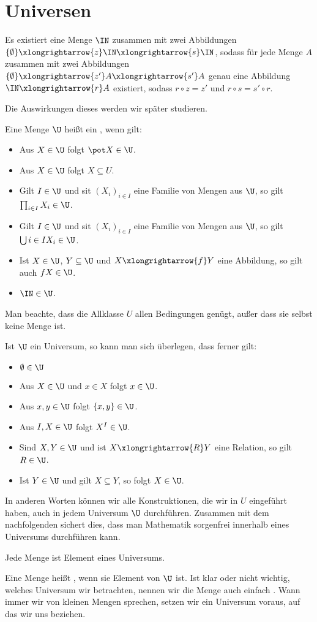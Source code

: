 \section{Universen}

\begin{axiom}
Es existiert eine Menge $\IN$ zusammen mit zwei Abbildungen $\{\emptyset\}\xlongrightarrow{z}\IN\xlongrightarrow{s}\IN$, sodass für jede Menge $A$ zusammen mit zwei Abbildungen $\{\emptyset\}\xlongrightarrow{z'}A\xlongrightarrow{s'}A$ genau eine Abbildung $\IN\xlongrightarrow{r}A$ existiert, sodass $r\circ z=z'$ und $r\circ s=s'\circ r$.
\end{axiom}
Die Auswirkungen dieses  werden wir später studieren.

Eine Menge $\U$ heißt ein , wenn gilt:
\begin{itemize}
\item Aus $X\in\U$ folgt $\pot X\in\U$.
\item Aus $X\in\U$ folgt $X\subseteq U$.
\item Gilt $I\in\U$ und sit $(X_i)_{i\in I}$ eine Familie von Mengen aus $\U$, so gilt $\prod_{i\in I}X_i\in\U$.
\item Gilt $I\in\U$ und sit $(X_i)_{i\in I}$ eine Familie von Mengen aus $\U$, so gilt $\bigcup{i\in I}X_i\in\U$.
\item Ist $X\in\U$, $Y\subseteq\U$ und $X\xlongrightarrow{f}Y$ eine Abbildung, so gilt auch $fX\in\U$.
\item $\IN\in\U$.
\end{itemize}

Man beachte, dass die Allklasse $U$ allen Bedingungen genügt, außer dass sie selbst keine Menge ist.

Ist $\U$ ein Universum, so kann man sich überlegen, dass ferner gilt:

\begin{itemize}
\item $\emptyset\in\U$
\item Aus $X\in\U$ und $x\in X$ folgt $x\in\U$.
\item Aus $x,y\in\U$ folgt $\{x,y\}\in\U$.
\item Aus $I,X\in\U$ folgt $X^I\in\U$.
\item Sind $X,Y\in\U$ und ist $X\xlongrightarrow{R}Y$ eine Relation, so gilt $R\in\U$.
\item Ist $Y\in\U$ und gilt $X\subseteq Y$, so folgt $X\in\U$.
\end{itemize}

In anderen Worten können wir alle Konstruktionen, die wir in $U$ eingeführt haben, auch in jedem Universum $\U$ durchführen. Zusammen mit dem nachfolgenden  sichert dies, dass man Mathematik sorgenfrei innerhalb eines Universums durchführen kann.

\begin{axiom}
Jede Menge ist Element eines Universums.
\end{axiom}

Eine Menge heißt , wenn sie Element von $\U$ ist. Ist klar oder nicht wichtig, welches Universum wir betrachten, nennen wir die Menge auch einfach . Wann immer wir von kleinen Mengen sprechen, setzen wir ein Universum voraus, auf das wir uns beziehen.
